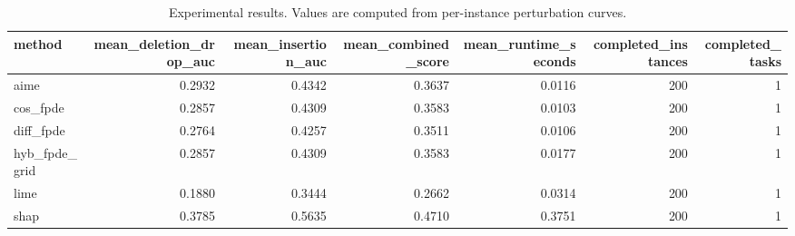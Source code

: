 \begin{table}[t]
\caption{Experimental results. Values are computed from per-instance perturbation curves.}
\label{tab:main_results_computed}
\centering
\begin{tabular}{lrrrrrr}
\toprule
method & mean\_deletion\_drop\_auc & mean\_insertion\_auc & mean\_combined\_score & mean\_runtime\_seconds & completed\_instances & completed\_tasks \\
\midrule
aime & 0.2932 & 0.4342 & 0.3637 & 0.0116 & 200 & 1 \\
cos\_fpde & 0.2857 & 0.4309 & 0.3583 & 0.0103 & 200 & 1 \\
diff\_fpde & 0.2764 & 0.4257 & 0.3511 & 0.0106 & 200 & 1 \\
hyb\_fpde\_grid & 0.2857 & 0.4309 & 0.3583 & 0.0177 & 200 & 1 \\
lime & 0.1880 & 0.3444 & 0.2662 & 0.0314 & 200 & 1 \\
shap & 0.3785 & 0.5635 & 0.4710 & 0.3751 & 200 & 1 \\
\bottomrule
\end{tabular}

\end{table}
